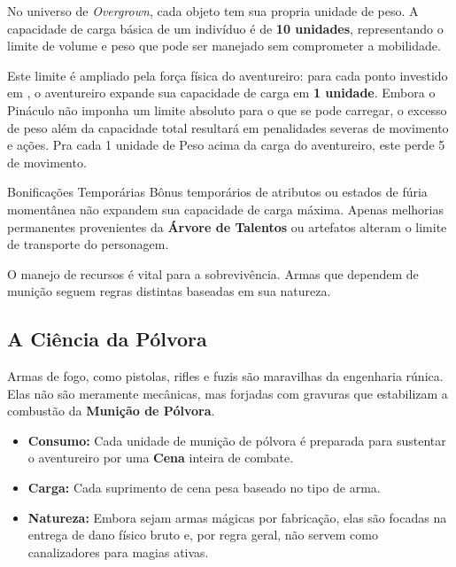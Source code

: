 

No universo de \textit{Overgrown}, cada objeto tem sua propria unidade de peso. A capacidade de carga básica de um indivíduo é de \textbf{10 unidades}, representando o limite de volume e peso que pode ser manejado sem comprometer a mobilidade.

Este limite é ampliado pela força física do aventureiro: para cada ponto investido em , o aventureiro expande sua capacidade de carga em \textbf{1 unidade}. Embora o Pináculo não imponha um limite absoluto para o que se pode carregar, o excesso de peso além da capacidade total resultará em penalidades severas de movimento e ações. Pra cada 1 unidade de Peso acima da carga do aventureiro, este perde 5 de movimento.

\begin{rpgboxtips}{Bonificações Temporárias}
Bônus temporários de atributos ou estados de fúria momentânea não expandem sua capacidade de carga máxima. Apenas melhorias permanentes provenientes da \textbf{Árvore de Talentos} ou artefatos  alteram o limite de transporte do personagem.
\end{rpgboxtips}


O manejo de recursos é vital para a sobrevivência. Armas que dependem de munição seguem regras distintas baseadas em sua natureza.

\subsection*{A Ciência da Pólvora}
Armas de fogo, como pistolas, rifles e fuzis são maravilhas da engenharia rúnica. Elas não são meramente mecânicas, mas forjadas com gravuras que estabilizam a combustão da \textbf{Munição de Pólvora}. 
\begin{itemize}
    \item \textbf{Consumo:} Cada unidade de munição de pólvora é preparada para sustentar o aventureiro por uma \textbf{Cena} inteira de combate.
    \item \textbf{Carga:} Cada suprimento de cena pesa baseado no tipo de arma.
    \item \textbf{Natureza:} Embora sejam armas mágicas por fabricação, elas são focadas na entrega de dano físico bruto e, por regra geral, não servem como canalizadores para magias ativas.
\end{itemize}

